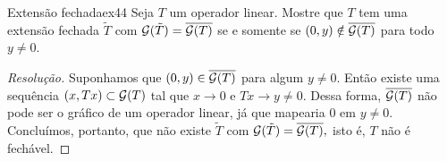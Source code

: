 \begin{exercício}{Extensão fechada}{ex44}
  Seja \(T\) um operador linear. Mostre que \(T\) tem uma extensão fechada \(\tilde{T}\) com \(\mathcal{G}(\tilde{T}) = \overline{\mathcal{G}(T)}\) se e somente se \((0,y) \notin \overline{\mathcal{G}(T)}\) para todo \(y \neq 0.\)
\end{exercício}
\begin{proof}[Resolução]

  Suponhamos que \((0,y) \in \overline{\mathcal{G}(T)}\) para algum \(y \neq 0.\) Então existe uma sequência \((x, Tx) \subset \mathcal{G}(T)\) tal que \(x \to 0\) e \(Tx \to y \neq 0.\) Dessa forma, \(\overline{\mathcal{G}(T)}\) não pode ser o gráfico de um operador linear, já que mapearia \(0\) em \(y \neq 0.\) Concluímos, portanto, que não existe \(\tilde{T}\) com \(\mathcal{G}(\tilde{T}) = \overline{\mathcal{G}(T)},\) isto é, \(T\) não é fechável.


\end{proof}
